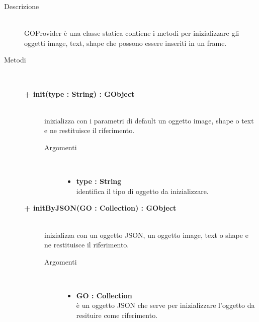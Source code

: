 \begin{description}
\item[Descrizione] \hfill \\
	GOProvider è una classe statica contiene i metodi per inizializzare gli oggetti image, text, shape che possono essere inseriti in un frame.
	
\item[Metodi] \hfill \\

	\begin{description}
		\item[\textbf{+ init(type : String) : GObject			}] \hfill \\
			inizializza con i parametri di default un oggetto image, shape o text e ne restituisce il riferimento.
			
		\begin{description}
			\item[Argomenti] \hfill \\
				\begin{itemize}
				
					\item \textbf{type : String			} \hfill \\
					identifica il tipo di oggetto da inizializzare.
				\end{itemize}
		\end{description}

\end{description}

	\begin{description}
		\item[\textbf{+ initByJSON(GO : Collection) : GObject			}] \hfill \\
			inizializza con un oggetto JSON, un oggetto image, text o shape e ne restituisce il riferimento.
			
		\begin{description}
			\item[Argomenti] \hfill \\
				\begin{itemize}
				
					\item \textbf{GO : Collection			} \hfill \\
					è un oggetto JSON che serve per inizializzare l'oggetto da resituire come riferimento.
				\end{itemize}
		\end{description}

\end{description}

\end{description}

